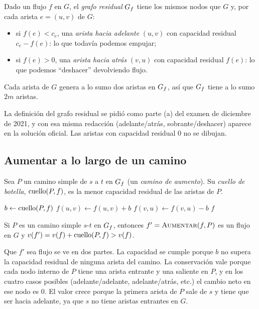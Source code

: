 Dado un flujo $f$ en $G$, el \emph{grafo residual} $G_f$ tiene los mismos nodos que $G$ y, por cada arista $e=(u,v)$ de $G$:
\begin{itemize}
  \item si $f(e)<c_e$, una \emph{arista hacia adelante} $(u,v)$ con capacidad residual $c_e-f(e)$: lo que todavía podemos empujar;
  \item si $f(e)>0$, una \emph{arista hacia atrás} $(v,u)$ con capacidad residual $f(e)$: lo que podemos ``deshacer'' devolviendo flujo.
\end{itemize}
Cada arista de $G$ genera a lo sumo dos aristas en $G_f$, así que $G_f$ tiene a lo sumo $2m$ aristas.

La definición del grafo residual se pidió como parte (a) del examen de diciembre de 2021, y con esa misma redacción (adelante/atrás, sobrante/deshacer) aparece en la solución oficial. Las aristas con capacidad residual $0$ no se dibujan.

\subsection{Aumentar a lo largo de un camino}

Sea $P$ un camino simple de $s$ a $t$ en $G_f$ (un \emph{camino de aumento}). Su \emph{cuello de botella}, $\operatorname{cuello}(P,f)$, es la menor capacidad residual de las aristas de $P$.

\begin{algorithmic}[1]
  \State $b\gets \operatorname{cuello}(P,f)$
      \State $f(u,v)\gets f(u,v)+b$ 
    \Else
      \State $f(v,u)\gets f(v,u)-b$ 
    \EndIf
  \EndFor
  \State \Return $f$
\EndFunction
\end{algorithmic}

\begin{resultado}[(7.1) y (7.3)]
Si $P$ es un camino simple $s$-$t$ en $G_f$, entonces $f'=\textsc{Aumentar}(f,P)$ es un flujo en $G$ y
$v(f')=v(f)+\operatorname{cuello}(P,f)>v(f)$.
\end{resultado}

Que $f'$ sea flujo se ve en dos partes. La capacidad se cumple porque $b$ no supera la capacidad residual de ninguna arista del camino. La conservación vale porque cada nodo interno de $P$ tiene una arista entrante y una saliente en $P$, y en los cuatro casos posibles (adelante/adelante, adelante/atrás, etc.) el cambio neto en ese nodo es $0$. El valor crece porque la primera arista de $P$ sale de $s$ y tiene que ser hacia adelante, ya que $s$ no tiene aristas entrantes en $G$.


